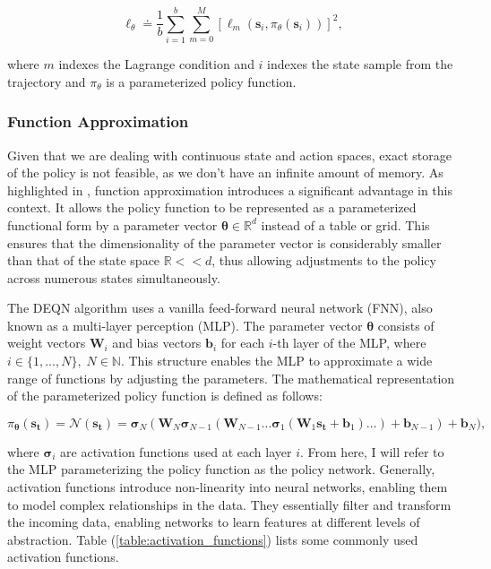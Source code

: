 \begin{equation}
    \ell_{\theta} \doteq \frac{1}{b} \sum_{i=1}^b \sum_{m=0}^M \left[ \ell_{m} \left(\bm{s}_i, \pi_\theta(\bm{s}_i)  \right) \right]^2,
\label{eq:total_objective_function}
\end{equation}

where \(m\) indexes the Lagrange condition and \(i\) indexes the state sample from the trajectory and \(\pi_\theta\) is a parameterized policy function.

\subsubsection{Function Approximation}

Given that we are dealing with continuous state and action spaces, exact storage of the policy is not feasible, as we don't have an infinite amount of memory. As highlighted in \textcite[p.~197]{Sutton2018intro_to_rl}, function approximation introduces a significant advantage in this context. It allows the policy function to be represented as a parameterized functional form by a parameter vector \(\bm{\theta} \in \mathbb{R}^d\) instead of a table or grid. This ensures that the dimensionality of the parameter vector is considerably smaller than that of the state space \(\mathbb{R} << d\), thus allowing adjustments to the policy across numerous states simultaneously.

The DEQN algorithm uses a vanilla feed-forward neural network (FNN), also known as a multi-layer perception (MLP). The parameter vector \(\bm{\theta}\) consists of weight vectors \(\bm{W}_i\) and bias vectors \(\bm{b}_i\) for each \(i\)-th layer of the MLP, where \(i\in \{1, ..., N\},\; N \in \mathbb{N}\). This structure enables the MLP to approximate a wide range of functions by adjusting the parameters. The mathematical representation of the parameterized policy function is defined as follows:

\begin{equation}
    \pi_{\bm{\theta}}(\bm{s_t}) = \mathcal{N}(\bm{s_t}) =
    \bm{\sigma}_N(\bm{W}_N \bm{\sigma}_{N-1}(\bm{W}_{N-1} ... \bm{\sigma}_1(\bm{W}_1 \bm{s_t} + \bm{b}_1) \dots ) + \bm{b}_{N-1}) + \bm{b}_N),
\end{equation}

where \(\bm{\sigma}_i\) are activation functions used at each layer \(i\). From here, I will refer to the MLP parameterizing the policy function as the policy network. Generally, activation functions introduce non-linearity into neural networks, enabling them to model complex relationships in the data. They essentially filter and transform the incoming data, enabling networks to learn features at different levels of abstraction. Table (\ref{table:activation_functions}) lists some commonly used activation functions.

